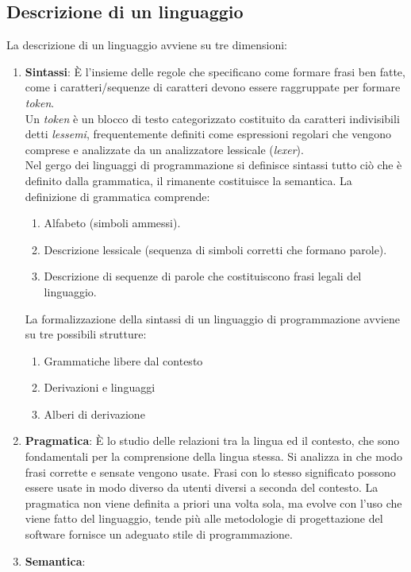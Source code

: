 \documentclass[a4paper, 10pt]{article}
\begin{document}
	\subsection{Descrizione di un linguaggio}
	La descrizione di un linguaggio avviene su tre dimensioni:
	\begin{enumerate}
		\item \textbf{Sintassi}:
		È l'insieme delle regole che specificano come formare frasi ben fatte, come i caratteri/sequenze di caratteri devono essere raggruppate per formare \textit{token}. \\
		Un \textit{token} è un blocco di testo categorizzato costituito da caratteri indivisibili detti \textit{lessemi}, frequentemente definiti come espressioni regolari che vengono comprese e analizzate da un analizzatore lessicale (\textit{lexer}).\\
		Nel gergo dei linguaggi di programmazione si definisce sintassi tutto ciò che è definito dalla grammatica, il rimanente costituisce la semantica.
		La definizione di grammatica comprende:
		\begin{enumerate}
			\item Alfabeto (simboli ammessi).
			\item Descrizione lessicale (sequenza di simboli corretti che formano parole).
			\item Descrizione di sequenze di parole che costituiscono frasi legali del linguaggio.
		\end{enumerate}
		La formalizzazione della sintassi di un linguaggio di programmazione avviene su tre possibili strutture:
		\begin{enumerate}
			\item Grammatiche libere dal contesto
			\item Derivazioni e linguaggi
			\item Alberi di derivazione
		\end{enumerate}
		\item \textbf{Pragmatica}: 
		È lo studio delle relazioni tra la lingua ed il contesto, che sono fondamentali per la comprensione della lingua stessa. Si analizza in che modo frasi corrette e sensate vengono usate.
		Frasi con lo stesso significato possono essere usate in modo diverso da utenti diversi a seconda del contesto.
		La pragmatica non viene definita a priori una volta sola, ma evolve con l'uso che viene fatto del linguaggio, tende più alle metodologie di progettazione del software fornisce un adeguato stile di programmazione.
		\item \textbf{Semantica}:

\end{enumerate}
\end{document}
